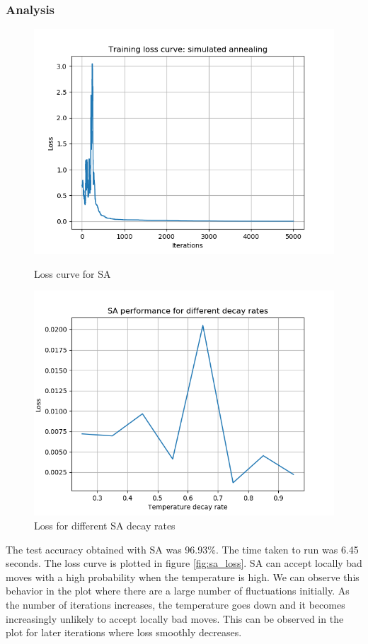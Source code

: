 \documentclass[letterpaper]{article}
\begin{document}
	\subsubsection{Analysis}
	\begin{figure}
		\centering
		\begin{minipage}{.5\textwidth}
			\centering
			\includegraphics[width=\linewidth]{../plots/nn_loss_sa}
			\caption{Loss curve for SA}
			\label{fig:sa_loss}
		\end{minipage}%
		\begin{minipage}{.5\textwidth}
			\centering
			\includegraphics[width=\linewidth]{../plots/nn_sa_decay_rates}
			\caption{Loss for different SA decay rates}
			\label{fig:sa_decay}			
		\end{minipage}
	\end{figure}
	The test accuracy obtained with SA was 96.93\%. The time taken to run was 6.45 seconds. The loss curve is plotted in figure \ref{fig:sa_loss}. SA can accept locally bad moves with a high probability when the temperature is high. We can observe this behavior in the plot where there are a large number of fluctuations initially. As the number of iterations increases, the temperature goes down and it becomes increasingly unlikely to accept locally bad moves. This can be observed in the plot for later iterations where loss smoothly decreases.
	
\end{document}
